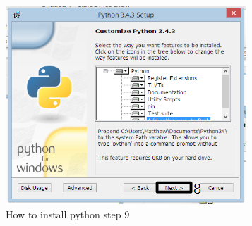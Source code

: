 \begin{enumerate}
\begin{figure}[H]
	\includegraphics{./manual/images/python-installation-instructions-5.png}
	\caption{How to install python step 9}
\end{figure}
\end{enumerate}

